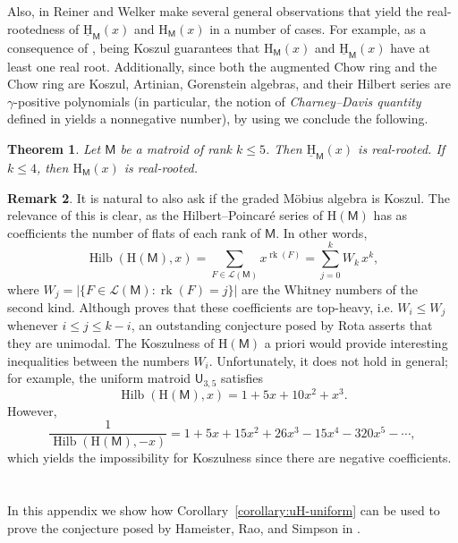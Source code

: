 \documentclass[11pt, a4paper, english]{amsart}
\theoremstyle{teoremas}
\newtheorem{theorem}{Theorem}[section]
\theoremstyle{definition}
\newtheorem{remark}[theorem]{Remark}
\DeclareMathOperator{\rk}{rk}
\newcommand{\M}{\mathsf{M}}
\newcommand{\U}{\mathsf{U}}
\newcommand{\Hilb}{\operatorname{Hilb}}
\renewcommand{\H}{\mathrm{H}}
\newcommand{\uH}{\underline{\mathrm{H}}}
\begin{document}
Also, in \cite[Section~4]{reiner-welker} Reiner and Welker make several general observations that yield the real-rootedness of $\uH_{\M}(x)$ and $\H_{\M}(x)$ in a number of cases. For example, as a consequence of \cite[Proposition~4.13]{reiner-welker}, being Koszul guarantees that $\H_{\M}(x)$ and $\uH_{\M}(x)$ have at least one real root. Additionally, since both the augmented Chow ring and the Chow ring are Koszul, Artinian, Gorenstein algebras, and their Hilbert series are $\gamma$-positive polynomials (in particular, the notion of \emph{Charney--Davis quantity} defined in \cite{reiner-welker} yields a nonnegative number), by using \cite[Corollary~4.3 and Corollary~4.14]{reiner-welker} we conclude the following.

\begin{theorem}
    Let $\M$ be a matroid of rank $k\leq 5$. Then $\uH_{\M}(x)$ is real-rooted. If $k\leq 4$, then $\H_{\M}(x)$ is real-rooted.
\end{theorem}

\begin{remark}
   It is natural to also ask if the graded M\"obius algebra is Koszul. The relevance of this is clear, as the Hilbert--Poincar\'e series of $\H(\M)$ has as coefficients the number of flats of each rank of $\M$. In other words,
        \[ \Hilb(\H(\M), x) = \sum_{F\in \mathcal{L}(\M)} x^{\rk(F)} = \sum_{j=0}^k W_k\, x^k,\]
    where $W_j = |\{F\in\mathcal{L}(\M): \rk(F) = j\}|$ are the Whitney numbers of the second kind. Although \cite[Theorem~1.1]{braden-huh-matherne-proudfoot-wang} proves that these coefficients are top-heavy, i.e. $W_i \leq W_j$ whenever $i\leq j \leq k-i$, an outstanding conjecture posed by Rota \cite{rota} asserts that they are unimodal. The Koszulness of $\H(\M)$ a priori would provide interesting inequalities between the numbers $W_i$. Unfortunately, it does not hold in general; for example, the uniform matroid $\U_{3,5}$ satisfies
        \[ \Hilb(\H(\M), x) = 1 + 5x + 10x^2 + x^3.\]
    However,
        \[ \frac{1}{\Hilb(\H(\M),-x)} = 1 + 5x + 15x^2 + 26x^3 - 15x^4 - 320x^5 - \cdots,\]
    which yields the impossibility for Koszulness since there are negative coefficients.
\end{remark}

\appendix

\section{}\label{appendix}

In this appendix we show how Corollary~\ref{corollary:uH-uniform} can be used to prove the conjecture posed by Hameister, Rao, and Simpson in \cite[Conjecture 6.2]{hameister-rao-simpson}.
\end{document}
